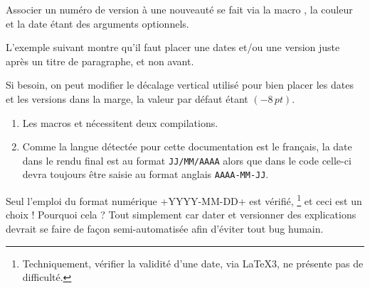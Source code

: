 \begin{tdocexa}
    Associer un numéro de version à une nouveauté se fait via la macro , la couleur et la date étant des arguments optionnels.

\end{tdocexa}


\begin{tdocexa}
	L'exemple suivant montre qu'il faut placer une dates et/ou une version juste après un titre de paragraphe, et non avant.

\end{tdocexa}


\begin{tdocexa}
	Si besoin, on peut modifier le décalage vertical utilisé pour bien placer les dates et les versions dans la marge, la valeur par défaut étant $(-8\,\mathit{pt})$.

\end{tdocexa}


\begin{tdocimp}
    \begin{enumerate}[wide]
        \item Les macros  et  nécessitent deux compilations.

        \item Comme la langue détectée pour cette documentation est le français, la date dans le rendu final est au format \texttt{JJ/MM/AAAA} alors que dans le code celle-ci devra toujours être saisie au format anglais \texttt{AAAA-MM-JJ}.
    \end{enumerate}
\end{tdocimp}


\begin{tdoccaut}
    Seul l'emploi du format numérique \tdoclatexin+YYYY-MM-DD+ est vérifié,%
    \footnote{
        Techniquement, vérifier la validité d'une date, via \LaTeX3, ne présente pas de difficulté.
    }
    et ceci est un choix ! Pourquoi cela ? Tout simplement car dater et versionner des explications devrait se faire de façon semi-automatisée afin d'éviter tout bug humain.
\end{tdoccaut}


